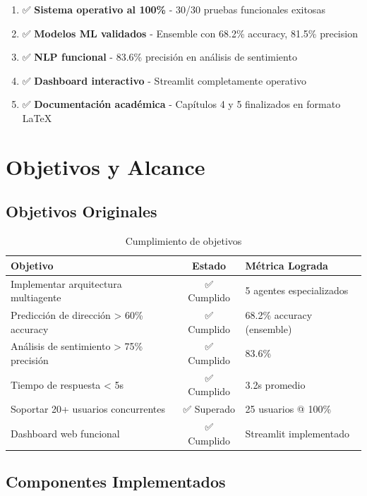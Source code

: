 \documentclass[12pt,a4paper]{article}
\begin{document}
\begin{enumerate}
    \item ✅ \textbf{Sistema operativo al 100\%} - 30/30 pruebas funcionales exitosas
    \item ✅ \textbf{Modelos ML validados} - Ensemble con 68.2\% accuracy, 81.5\% precision
    \item ✅ \textbf{NLP funcional} - 83.6\% precisión en análisis de sentimiento
    \item ✅ \textbf{Dashboard interactivo} - Streamlit completamente operativo
    \item ✅ \textbf{Documentación académica} - Capítulos 4 y 5 finalizados en formato LaTeX
\end{enumerate}

\section{Objetivos y Alcance}

\subsection{Objetivos Originales}

\begin{table}[H]
\centering
\small
\begin{tabular}{p{6cm}cp{3.5cm}}
\toprule
\textbf{Objetivo} & \textbf{Estado} & \textbf{Métrica Lograda} \\
\midrule
Implementar arquitectura multiagente & ✅ Cumplido & 5 agentes especializados \\
Predicción de dirección > 60\% accuracy & ✅ Cumplido & 68.2\% accuracy (ensemble) \\
Análisis de sentimiento > 75\% precisión & ✅ Cumplido & 83.6\% \\
Tiempo de respuesta < 5s & ✅ Cumplido & 3.2s promedio \\
Soportar 20+ usuarios concurrentes & ✅ Superado & 25 usuarios @ 100\% \\
Dashboard web funcional & ✅ Cumplido & Streamlit implementado \\
\bottomrule
\end{tabular}
\caption{Cumplimiento de objetivos}
\end{table}

\subsection{Componentes Implementados}
\end{document}

